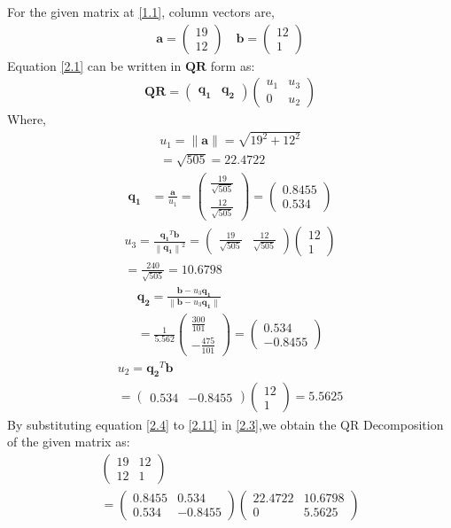 \documentclass[journal,12pt,twocolumn]{IEEEtran}
\let\vec\mathbf
\numberwithin{equation}{subsection}
\newcommand{\myvec}[1]{\ensuremath{\begin{pmatrix}#1\end{pmatrix}}}
\newcommand{\norm}[1]{\left\lVert#1\right\rVert}
\begin{document}
For the given matrix at \ref{1.1}, column vectors are,
\begin{align}
    \vec{a}=\myvec{19\\12} \quad \vec{b}=\myvec{12\\1} \label{2.2}
\end{align}
Equation  \ref{2.1} can be written in $\vec{Q}\vec{R}$ form as:
\begin{align}
    \vec{Q}\vec{R} = \myvec{\vec{q_1}&\vec{q_2}} \myvec{u_1&u_3\\0&u_2}  \label{2.3}
\end{align}
Where,
\begin{multline}
u_1 = \norm{\vec{a}} = \sqrt{19^2+12^2}\\ = \sqrt{505} = 22.4722 \label{2.4}
\end{multline}
\begin{align}
\vec{q_1} &= \frac{\vec{a}}{u_1} = \myvec{\frac{19}{\sqrt{505}}\\ \frac{12}{\sqrt{505}}} =\myvec{0.8455 \\ 0.534}
\end{align}
\begin{multline}
u_3 = \frac{\vec{q_1}^T\vec{b}}{\norm{\vec{q_1}}^2} = \myvec{\frac{19}{\sqrt{505}}& \frac{12}{\sqrt{505}}}\myvec{12\\1}\\= \frac{240}{\sqrt{505}} = 10.6798
\end{multline}
\begin{multline}
\vec{q_2} = \frac{\vec{b} - u_3 \vec{q_1}}{\norm{\vec{b} - u_3 \vec{q_1}}} \\= \frac{1}{5.562}\myvec{\frac{300}{101}\\ -\frac{475}{101}}= \myvec{0.534 \\ -0.8455}
\end{multline}
\begin{multline}
u_2 = {\vec{q_2}^T\vec{b}} \\= \myvec{0.534 & -0.8455}\myvec{12\\1}=5.5625\label{2.11}
\end{multline}
By substituting equation  \ref{2.4} to  \ref{2.11} in  \ref{2.3},we obtain
the QR Decomposition of the given matrix as:
\begin{multline}
    \myvec{19&12\\12&1} \\= \myvec{0.8455&0.534\\0.534&-0.8455}\myvec{22.4722 &10.6798\\0&5.5625}
\end{multline}
\end{document}
